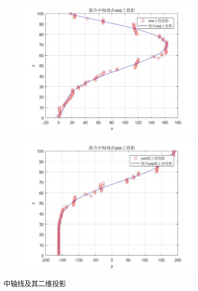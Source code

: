 \begin{figure}[H]
\begin{subfigure}[b]{0.4\textwidth}
                \end{subfigure}
                \begin{subfigure}[b]{0.4\textwidth}
                    \includegraphics[width=\textwidth]{images/zhongzhouxian_xoz.jpg}
                \end{subfigure}
                \begin{subfigure}[b]{0.4\textwidth}
                    \includegraphics[width=\textwidth]{images/zhongzhouxian_yoz.jpg}
                \end{subfigure}
                \caption{中轴线及其二维投影}
                \label{中轴线及其二维投影}
            \end{figure}

